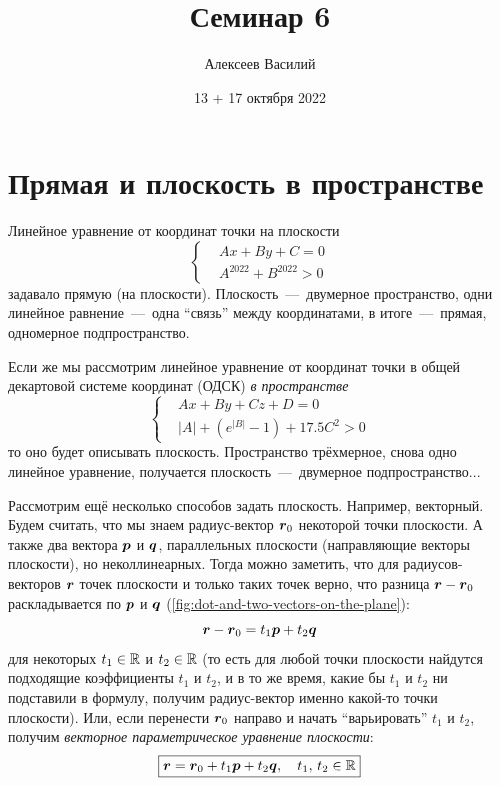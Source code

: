 \documentclass[a4paper,12pt]{article}
\author{Алексеев Василий}
\title{Семинар 6}
\date{13 + 17 октября 2022}
\begin{document}
  \maketitle
  
  \tableofcontents

  \thispagestyle{empty}
  
  \newpage
  


  \section{Прямая и плоскость в пространстве}
  
  Линейное уравнение от координат точки на плоскости
  \[
    \left\{
      \begin{aligned}
        &Ax + By + C = 0\\
        &A^{2022} + B^{2022} > 0
      \end{aligned}
    \right.
  \]
  задавало прямую (на плоскости).
  Плоскость~---~двумерное пространство, одни линейное равнение~---~одна ``связь'' между координатами, в итоге~---~прямая, одномерное подпространство.
  
  Если же мы рассмотрим линейное уравнение от координат точки в общей декартовой системе координат (ОДСК) \emph{в пространстве}
  \begin{equation}\label{eq:plane-by-coords}
    \boxed{
      \left\{
        \begin{aligned}
          &Ax + By + Cz + D = 0\\
          &|A| + \left(e^{|B|} - 1\right) + 17.5 C^2 > 0
        \end{aligned}
      \right.
    }
  \end{equation}
  то оно будет описывать плоскость.
  Пространство трёхмерное, снова одно линейное уравнение, получается плоскость~---~двумерное подпространство...
  
  Рассмотрим ещё несколько способов задать плоскость.
  Например, векторный.
  Будем считать, что мы знаем радиус-вектор $\boldsymbol r_0$ некоторой точки плоскости.
  А также два вектора $\boldsymbol p$ и $\boldsymbol q$, параллельных плоскости (направляющие векторы плоскости), но неколлинеарных.
  Тогда можно заметить, что для радиусов-векторов $\boldsymbol r$ точек плоскости и только таких точек верно, что разница $\bds r \hm- \bds r_0$ раскладывается по $\boldsymbol p$ и $\boldsymbol q$ (\ref{fig:dot-and-two-vectors-on-the-plane}):
  \[
    \boldsymbol r - \boldsymbol r_0 = t_1 \boldsymbol p + t_2 \boldsymbol q
  \]
  для некоторых $t_1 \hm\in \RR$ и $t_2 \hm\in \RR$ (то есть для любой точки плоскости найдутся подходящие коэффициенты $t_1$ и $t_2$, и в то же время, какие бы $t_1$ и $t_2$ ни подставили в формулу, получим радиус-вектор именно какой-то точки плоскости).
  Или, если перенести $\boldsymbol r_0$ направо и начать ``варьировать'' $t_1$ и $t_2$, получим \emph{векторное параметрическое уравнение плоскости}:
  \begin{equation}\label{eq:plane-vector-parametric}
    \boxed{
      \boldsymbol r = \boldsymbol r_0 + t_1 \boldsymbol p + t_2 \boldsymbol q,\quad t_1,\, t_2 \in \operatorname{\mathbb R}
    }
  \end{equation}
  
\end{document}
